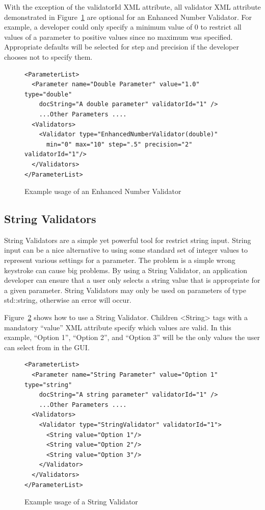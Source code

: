 With the exception of the validatorId XML attribute, all validator XML attribute demonstrated in Figure~\ref{EnhancedNumberValidatorXML}
are optional for an Enhanced Number Validator. For example, a developer could only specify a minimum value of 0 to restrict all 
values of a parameter to positive values since no maximum was specified.
Appropriate defaults will be selected for step and precision if the developer chooses not to specify them.
\begin{figure}
\centering
{\footnotesize
\begin{Verbatim}
<ParameterList>
  <Parameter name="Double Parameter" value="1.0" type="double" 
    docString="A double parameter" validatorId="1" />
    ...Other Parameters ....
  <Validators>
    <Validator type="EnhancedNumberValidator(double)" 
      min="0" max="10" step=".5" precision="2" validatorId="1"/>
  </Validators>
</ParameterList>
\end{Verbatim}
}
\caption{Example usage of an Enhanced Number Validator}
\label{EnhancedNumberValidatorXML}
\end{figure}

\subsection{String Validators}
String Validators are a simple yet powerful tool for restrict string input. String input can be a nice alternative to
using some standard set of integer values to represent various settings for a parameter. The problem is a simple wrong 
keystroke can cause big problems. By using a String Validator, an application developer can ensure that a user 
only selects a string value that is appropriate for a given parameter. 
String Validators may only be used on parameters of type std::string, otherwise an error will occur.

Figure~\ref{StringValidatorXML} shows how to use a String Validator. Children <String> tags with a mandatory ``value'' XML attribute specify which values are 
valid.  In this example, ``Option 1'', ``Option 2'', and ``Option 3'' will be the only values the user can select from in the GUI.
\begin{figure}
\centering
{\footnotesize
\begin{Verbatim}
<ParameterList>
  <Parameter name="String Parameter" value="Option 1" type="string" 
    docString="A string parameter" validatorId="1" />
    ...Other Parameters ....
  <Validators>
    <Validator type="StringValidator" validatorId="1">
      <String value="Option 1"/> 
      <String value="Option 2"/> 
      <String value="Option 3"/> 
    </Validator>
  </Validators>
</ParameterList>
\end{Verbatim}
}
\caption{Example usage of a String Validator}
\label{StringValidatorXML}
\end{figure}

